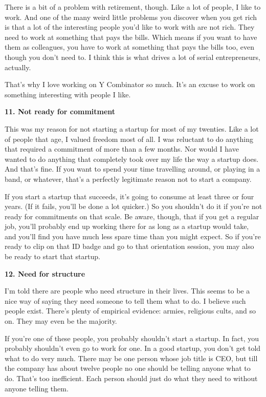 There is a bit of a problem with retirement, though. Like a lot of
people, I like to work. And one of the many weird little problems you
discover when you get rich is that a lot of the interesting people you'd
like to work with are not rich. They need to work at something that pays
the bills. Which means if you want to have them as colleagues, you have
to work at something that pays the bills too, even though you don't need
to. I think this is what drives a lot of serial entrepreneurs, actually.

That's why I love working on Y Combinator so much. It's an excuse to
work on something interesting with people I like.

\textbf{11. Not ready for commitment}

This was my reason for not starting a startup for most of my twenties.
Like a lot of people that age, I valued freedom most of all. I was
reluctant to do anything that required a commitment of more than a few
months. Nor would I have wanted to do anything that completely took over
my life the way a startup does. And that's fine. If you want to spend
your time travelling around, or playing in a band, or whatever, that's a
perfectly legitimate reason not to start a company.

If you start a startup that succeeds, it's going to consume at least
three or four years. (If it fails, you'll be done a lot quicker.) So you
shouldn't do it if you're not ready for commitments on that scale. Be
aware, though, that if you get a regular job, you'll probably end up
working there for as long as a startup would take, and you'll find you
have much less spare time than you might expect. So if you're ready to
clip on that ID badge and go to that orientation session, you may also
be ready to start that startup.

\textbf{12. Need for structure}

I'm told there are people who need structure in their lives. This seems
to be a nice way of saying they need someone to tell them what to do. I
believe such people exist. There's plenty of empirical evidence: armies,
religious cults, and so on. They may even be the majority.

If you're one of these people, you probably shouldn't start a startup.
In fact, you probably shouldn't even go to work for one. In a good
startup, you don't get told what to do very much. There may be one
person whose job title is CEO, but till the company has about twelve
people no one should be telling anyone what to do. That's too
inefficient. Each person should just do what they need to without anyone
telling them.

